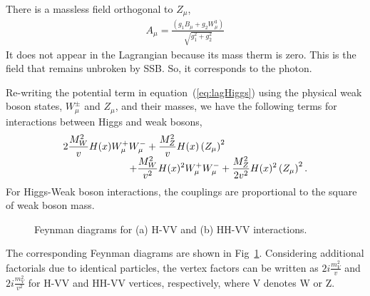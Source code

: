 There is a massless field orthogonal to $Z_\mu$,  
\begin{eqnarray} 
A_\mu = \frac{\left( g_1 B_\mu + g_2 W_\mu^3 \right)}{\sqrt{g_1^2+g_2^2}}  
\end{eqnarray}
It does not appear in the Lagrangian because its mass therm is zero.
This is the field that remains unbroken by SSB. So, it corresponds to the photon. 

Re-writing the potential term in equation~(\ref{eq:lagHiggs})
using the physical weak boson states, $W_\mu^\pm$ and $Z_\mu$,
and their masses, we have the following terms for interactions between Higgs and weak bosons,
\begin{eqnarray}
\begin{array}{ccc} \multicolumn{2}{c}{\displaystyle 
2\frac{M_W^2}{v} H(x) W^+_\mu W^-_\mu
+ \frac{M_Z^2}{v} H(x) \left( Z_\mu \right)^2
} & \\ & \multicolumn{2}{c}{\hspace{2cm} \displaystyle
+ \frac{M_W^2}{v^2} H(x)^2 W^+_\mu W^-_\mu 
+\frac{M_Z^2}{2v^2} H(x)^2 \left( Z_\mu \right)^2.
} \end{array}   
\end{eqnarray} 
For Higgs-Weak boson interactions, the couplings are proportional to the square 
of weak boson mass.
\begin{figure}[htp]
\centering
\vspace{1cm}
\hspace{1cm}
\caption{ Feynman diagrams for (a) H-VV and (b) HH-VV interactions.
}
\vspace{0.5cm}
\label{fig:fd_HVterm}
\end{figure}
The corresponding Feynman diagrams are shown in Fig~\ref{fig:fd_HVterm}. 
Considering additional factorials due to identical particles, the 
vertex factors can be written as $\displaystyle 2i \frac {m_V^2}{v}$ 
and $\displaystyle 2i \frac{m_V^2}{v^2}$ for H-VV and HH-VV vertices, respectively, 
where V denotes W or Z. 

